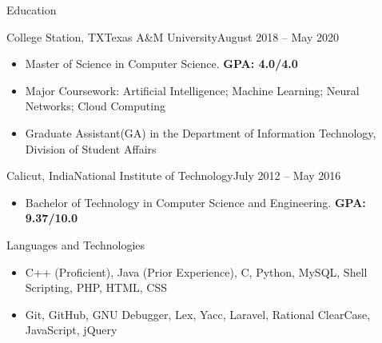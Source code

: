 \documentclass[]{mcdowellcv}
\begin{document}
	\makeheader
	
	\begin{cvsection}{Education}
		\begin{cvsubsection}{College Station, TX}{Texas A\&M University}{August 2018 -- May 2020}
			\begin{itemize}
				\item Master of Science in Computer Science. \textbf{GPA: 4.0/4.0}
				\item Major Coursework: Artificial Intelligence; Machine Learning; Neural Networks; Cloud Computing
				\item Graduate Assistant(GA) in the Department of Information Technology, Division of Student Affairs
			\end{itemize}
		\end{cvsubsection}
		
		\begin{cvsubsection}{Calicut, India}{National Institute of Technology}{July 2012 -- May 2016}
			\begin{itemize}
				\item Bachelor of Technology in Computer Science and Engineering. \textbf{GPA: 9.37/10.0}
			\end{itemize}
		\end{cvsubsection}
	\end{cvsection}
	
	\begin{cvsection}{Languages and Technologies}
		\begin{cvsubsection}{}{}{}	
			\begin{itemize}
				\item C++ (Proficient), Java (Prior Experience), C, Python, MySQL, Shell Scripting, PHP, HTML, CSS 
				\item Git, GitHub, GNU Debugger, Lex, Yacc, Laravel, Rational ClearCase, JavaScript, jQuery
			\end{itemize}
		\end{cvsubsection}
	\end{cvsection}
	
\end{document}
